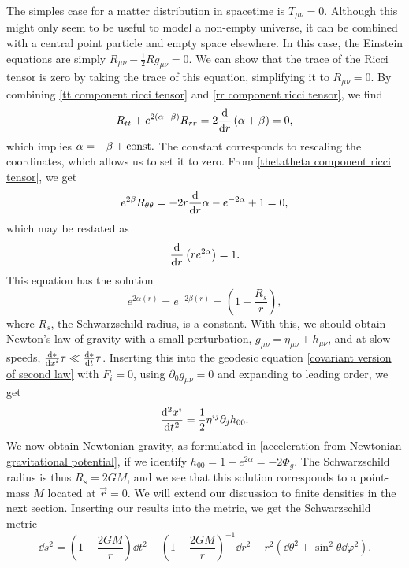 The simples case for a matter distribution in spacetime is $T_{\mu \nu} = 0$.
Although this might only seem to be useful to model a non-empty universe, it can be combined with a central point particle and empty space elsewhere.
In this case, the Einstein equations are simply $R_{\mu \nu} - \frac{1}{2}R g_{\mu \nu} = 0$.
We can show that the trace of the Ricci tensor is zero by taking the trace of this equation, simplifying it to $R_{\mu \nu} = 0$.
By combining \autoref{tt component ricci tensor} and \autoref{rr component ricci tensor}, we find
%
\begin{equation}
    R_{tt} + e^{2(\alpha - \beta)}R_{rr} = 2 \odv{}{r} \left(\alpha + \beta\right) = 0,
\end{equation}
%
which implies $\alpha = -\beta + \mathrm{const.}$
The constant corresponds to rescaling the coordinates, which allows us to set it to zero.
From \autoref{thetatheta component ricci tensor}, we get
%
\begin{equation}
    e^{2 \beta} R_{\theta \theta} = - 2 r\odv{}{r} \alpha - e^{-2\alpha} + 1 = 0,
\end{equation}
%
which may be restated as
%
\begin{equation}
    \odv{}{r} \left(r e^{2 \alpha}\right) = 1.
\end{equation}
%
This equation has the solution
%
\begin{equation}
    e^{2\alpha(r)} = e^{-2 \beta(r)} = \left( 1- \frac{R_s}{r} \right),
\end{equation}
%
where $R_s$, the Schwarzschild radius, is a constant.
With this, we should obtain Newton's law of gravity with a small perturbation, $g_{\mu \nu} = \eta_{\mu \nu} + h_{\mu \nu}$, and at slow speeds, $\odv*{x^i}{\tau} \ll \odv*{t}{\tau}$.
Inserting this into the geodesic equation \autoref{covariant version of second law} with $F_i = 0$, using $\partial_0 g_{\mu \nu} = 0$ and expanding to leading order, we get
%
\begin{equation}
    \odv[2]{x^i}{t} = \frac{1}{2}\eta^{i j}\partial_j h_{00}.
\end{equation}
%
We now obtain Newtonian gravity, as formulated in \autoref{acceleration from Newtonian gravitational potential}, if we identify $h_{00} = 1 -  e^{2\alpha} = - 2 \Phi_g$.
The Schwarzschild radius is thus $R_s = 2 G M$, and we see that this solution corresponds to a point-mass $M$ located at $\vec r = 0$.
We will extend our discussion to finite densities in the next section.
Inserting our results into the metric, we get the Schwarzschild metric
%
\begin{equation}
    \label{Schwarzchild metric}
    \dd s^2 
    = 
    \left( 1 - \frac{2 G M}{r} \right) \dd t^2
    -\left( 1 - \frac{2 G M}{r} \right)^{-1} \dd r^2
    - r^2 \left(\dd \theta^2 + \sin^2 \theta \dd \varphi^2\right).
\end{equation}
%





